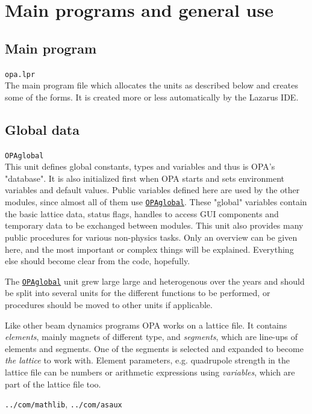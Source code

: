 \documentclass[12pt]{article}
\newcommand\code[1]{{\tt #1}}
\newcommand{\opauni}[1]{\colorbox{orange!30}{\code{#1}}}
\newcommand{\ounih}[2]{\subsection{\label{#2}#1}{\Huge\opauni{#2}}\\}
\newcommand{\ouni}[1]{\hyperref[#1]{\opauni{#1}}}
\newcommand{\uses}[1]{\flushleft {\bf Uses:} #1}
\newcommand{\desc}[1]{#1}
\newcommand{\todo}[1]{{\color{red} #1}}
\begin{document}
\section{\label{secglob}Main programs and general use}

\ounih{Main program}{{opa.lpr}}

\desc{The main program file which allocates the units as described below and creates some of the forms. It is created more or less automatically by the Lazarus IDE.}


\ounih{Global data}{OPAglobal}

\desc{
This unit defines global constants, types and variables and thus is OPA's "database". It is also initialized first when OPA starts and sets environment variables and default values. Public variables defined here are used by the other modules, since almost all of them use \ouni{OPAglobal}. These "global" variables contain the basic lattice data, status flags, handles to access GUI components and temporary data to be exchanged between modules. This unit also provides many public procedures for various non-physics tasks. Only an overview can be given here, and the most important or complex things will be explained. Everything else should become clear from the code, hopefully.

\todo{The \ouni{OPAglobal} unit grew large large and heterogenous over the years and should be split into several units for the different functions to be performed, or procedures should be moved to other units if applicable.}

Like other beam dynamics programs OPA works on a lattice file. It contains {\em elements}, mainly magnets of different type, and {\em segments}, which are line-ups of elements and segments. One of the segments is selected and expanded to become {\em the lattice} to work with. Element parameters, e.g. quadrupole strength in the lattice file can be numbers or arithmetic expressions using {\em variables}, which are part of the lattice file too.
}

\uses{\opauni{../com/mathlib}, \opauni{../com/asaux}}
\end{document}
